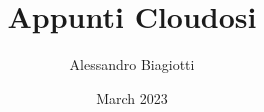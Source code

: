 \documentclass{article}
\title{Appunti Cloudosi}
\author{Alessandro Biagiotti}
\date{March 2023}
\begin{document}
\maketitle

\newcommand{\subDistance}{\vspace{1cm}\\}

\tableofcontents
\clearpage


\end{document}
